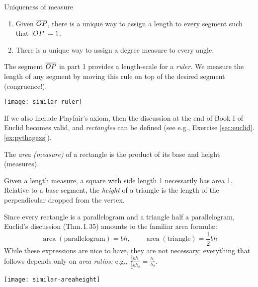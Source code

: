 \begin{thm}{Uniqueness of measure}{}
	\begin{enumerate}
	  \item Given $\overline{OP}$, there is a unique way to assign a length to every segment such that $\left| OP\right|=1$.
	  \item There is a unique way to assign a degree measure to every angle.
	\end{enumerate}
\end{thm}

\begin{minipage}[t]{0.49\linewidth}\vspace{0pt}
	The segment $\overline{OP}$ in part 1 provides a length-scale for a \emph{ruler.} We measure the length of any segment by moving this rule on top of the desired segment (congruence!).
\end{minipage}
\hfill
\begin{minipage}[t]{0.49\linewidth}\vspace{-5pt}
	\flushright
	\texttt{[image: similar-ruler]}
\end{minipage}


\goodbreak


If we also include Playfair's axiom, then the discussion at the end of Book I of Euclid becomes valid, and \emph{rectangles} can be defined (see e.g., Exercise \ref*{sec:euclid}.\ref{ex:pythagexs}).

\begin{defn}{}{}
	The \emph{area (measure)} of a rectangle is the product of its base and height (measures).
\end{defn}

Given a length measure, a square with side length 1 necessarily has area 1. Relative to a base segment, the \emph{height} of a triangle is the length of the perpendicular dropped from the vertex.\par

\begin{minipage}[t]{0.8\linewidth}\vspace{-8pt}
	Since every rectangle is a parallelogram and a triangle half a parallelogram, Euclid's discussion (Thm.\,I.\,35) amounts to the familiar area formulæ:
	\[
		\operatorname{area}(\text{parallelogram})=bh,\qquad \operatorname{area}(\text{triangle})=\frac 12bh
	\]
	While these expressions are nice to have, they are not necessary; everything that follows depends only on \emph{area ratios:} e.g., $\frac{\frac 12bh_1}{\frac 12bh_2}=\frac{h_1}{h_2}$.
\end{minipage}
\hfill
\begin{minipage}[t]{0.19\linewidth}\vspace{-8pt}
	\flushright
	\texttt{[image: similar-areaheight]}
\end{minipage}



